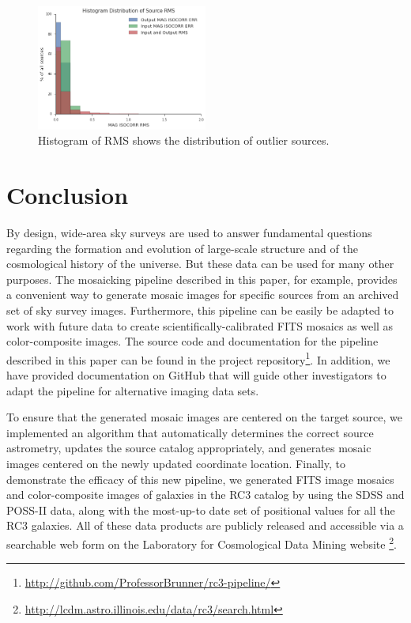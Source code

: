 \documentclass[authoryear, 12pt, 5p, times]{elsarticle}
\begin{document}
\begin{figure}[h]
\includegraphics[width=0.5\textwidth]{figures/histo_rms.png}
\caption{Histogram of RMS shows the distribution of outlier sources. }
\label{histo_rms}
\end{figure}


 \section{Conclusion\label{conc-sec}}
 
By design, wide-area sky surveys are used to answer fundamental questions regarding the formation and evolution of large-scale structure and of the cosmological history of the universe. But these data can be used for many other purposes. The mosaicking pipeline described in this paper, for example, provides a convenient way to generate mosaic images for specific sources from an archived set of sky survey images.  Furthermore, this pipeline can be easily be adapted to work with future data to create scientifically-calibrated FITS mosaics as well as color-composite images. The source code and documentation for the pipeline described in this paper can be found in the project repository\footnote{\url{http://github.com/ProfessorBrunner/rc3-pipeline/}}. In addition, we have provided documentation on GitHub that will guide other investigators to adapt the pipeline for alternative imaging data sets.

To ensure that the generated mosaic images are centered on the target source, we implemented an algorithm that automatically determines the correct source astrometry, updates the source catalog appropriately, and generates mosaic images centered on the newly updated coordinate location. Finally, to demonstrate the efficacy of this new pipeline, we generated FITS image mosaics and color-composite images of galaxies in the RC3 catalog by using the SDSS and POSS-II data, along with the most-up-to date set of positional values for all the RC3 galaxies. All of these data products are publicly released and accessible via a searchable web form on the Laboratory for Cosmological Data Mining website \footnote{\url{http://lcdm.astro.illinois.edu/data/rc3/search.html}}.
\end{document}
